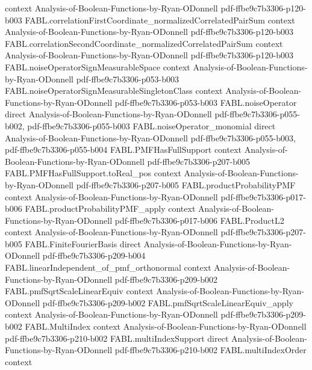 \begin{theorem}
  {context}
  {Analysis-of-Boolean-Functions-by-Ryan-ODonnell}
  {pdf-ffbe9c7b3306-p120-b003}
\proofstep
  {FABL.correlationFirstCoordinate_normalizedCorrelatedPairSum}
  {context}
  {Analysis-of-Boolean-Functions-by-Ryan-ODonnell}
  {pdf-ffbe9c7b3306-p120-b003}
\proofstep
  {FABL.correlationSecondCoordinate_normalizedCorrelatedPairSum}
  {context}
  {Analysis-of-Boolean-Functions-by-Ryan-ODonnell}
  {pdf-ffbe9c7b3306-p120-b003}
\proofstep
  {FABL.noiseOperatorSignMeasurableSpace}
  {context}
  {Analysis-of-Boolean-Functions-by-Ryan-ODonnell}
  {pdf-ffbe9c7b3306-p053-b003}
\proofstep
  {FABL.noiseOperatorSignMeasurableSingletonClass}
  {context}
  {Analysis-of-Boolean-Functions-by-Ryan-ODonnell}
  {pdf-ffbe9c7b3306-p053-b003}
\proofstep
  {FABL.noiseOperator}
  {direct}
  {Analysis-of-Boolean-Functions-by-Ryan-ODonnell}
  {pdf-ffbe9c7b3306-p055-b002,
    pdf-ffbe9c7b3306-p055-b003}
\proofstep
  {FABL.noiseOperator_monomial}
  {direct}
  {Analysis-of-Boolean-Functions-by-Ryan-ODonnell}
  {pdf-ffbe9c7b3306-p055-b003,
    pdf-ffbe9c7b3306-p055-b004}
\proofstep
  {FABL.PMFHasFullSupport}
  {context}
  {Analysis-of-Boolean-Functions-by-Ryan-ODonnell}
  {pdf-ffbe9c7b3306-p207-b005}
\proofstep
  {FABL.PMFHasFullSupport.toReal_pos}
  {context}
  {Analysis-of-Boolean-Functions-by-Ryan-ODonnell}
  {pdf-ffbe9c7b3306-p207-b005}
\proofstep
  {FABL.productProbabilityPMF}
  {context}
  {Analysis-of-Boolean-Functions-by-Ryan-ODonnell}
  {pdf-ffbe9c7b3306-p017-b006}
\proofstep
  {FABL.productProbabilityPMF_apply}
  {context}
  {Analysis-of-Boolean-Functions-by-Ryan-ODonnell}
  {pdf-ffbe9c7b3306-p017-b006}
\proofstep
  {FABL.ProductL2}
  {context}
  {Analysis-of-Boolean-Functions-by-Ryan-ODonnell}
  {pdf-ffbe9c7b3306-p207-b005}
\proofstep
  {FABL.FiniteFourierBasis}
  {direct}
  {Analysis-of-Boolean-Functions-by-Ryan-ODonnell}
  {pdf-ffbe9c7b3306-p209-b004}
\proofstep
  {FABL.linearIndependent_of_pmf_orthonormal}
  {context}
  {Analysis-of-Boolean-Functions-by-Ryan-ODonnell}
  {pdf-ffbe9c7b3306-p209-b002}
\proofstep
  {FABL.pmfSqrtScaleLinearEquiv}
  {context}
  {Analysis-of-Boolean-Functions-by-Ryan-ODonnell}
  {pdf-ffbe9c7b3306-p209-b002}
\proofstep
  {FABL.pmfSqrtScaleLinearEquiv_apply}
  {context}
  {Analysis-of-Boolean-Functions-by-Ryan-ODonnell}
  {pdf-ffbe9c7b3306-p209-b002}
\proofstep
  {FABL.MultiIndex}
  {context}
  {Analysis-of-Boolean-Functions-by-Ryan-ODonnell}
  {pdf-ffbe9c7b3306-p210-b002}
\proofstep
  {FABL.multiIndexSupport}
  {direct}
  {Analysis-of-Boolean-Functions-by-Ryan-ODonnell}
  {pdf-ffbe9c7b3306-p210-b002}
\proofstep
  {FABL.multiIndexOrder}
  {context}

\end{theorem}

